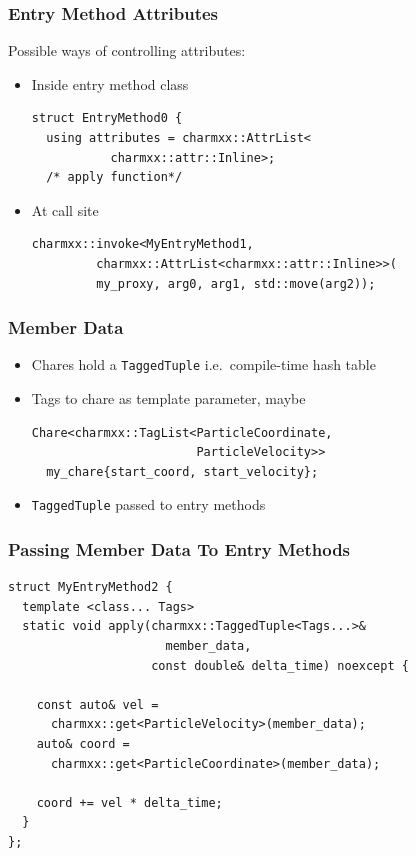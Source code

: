 \documentclass[svgnames,tikz,serif,ragged2e]{beamer}
\begin{document}
\begin{frame}[fragile]
  \frametitle{Entry Method Attributes}
  Possible ways of controlling attributes:
  \begin{itemize}
  \item Inside entry method class
\begin{lstlisting}
struct EntryMethod0 {
  using attributes = charmxx::AttrList<
           charmxx::attr::Inline>;
  /* apply function*/
\end{lstlisting}
  \item At call site
\begin{lstlisting}
charmxx::invoke<MyEntryMethod1,
         charmxx::AttrList<charmxx::attr::Inline>>(
         my_proxy, arg0, arg1, std::move(arg2));
\end{lstlisting}
  \end{itemize}
\end{frame}

\begin{frame}[fragile]
  \frametitle{Member Data}
  \begin{itemize}
  \item Chares hold a \texttt{TaggedTuple} i.e.~compile-time hash table
  \item Tags to chare as template parameter, maybe
\begin{lstlisting}
Chare<charmxx::TagList<ParticleCoordinate,
                       ParticleVelocity>>
  my_chare{start_coord, start_velocity};
\end{lstlisting}
  \item \texttt{TaggedTuple} passed to entry methods
  \end{itemize}
\end{frame}

\begin{frame}[fragile]
  \frametitle{Passing Member Data To Entry Methods}
\begin{lstlisting}
struct MyEntryMethod2 {
  template <class... Tags>
  static void apply(charmxx::TaggedTuple<Tags...>&
                      member_data,
                    const double& delta_time) noexcept {

    const auto& vel =
      charmxx::get<ParticleVelocity>(member_data);
    auto& coord =
      charmxx::get<ParticleCoordinate>(member_data);

    coord += vel * delta_time;
  }
};
\end{lstlisting}
\end{frame}
\end{document}
